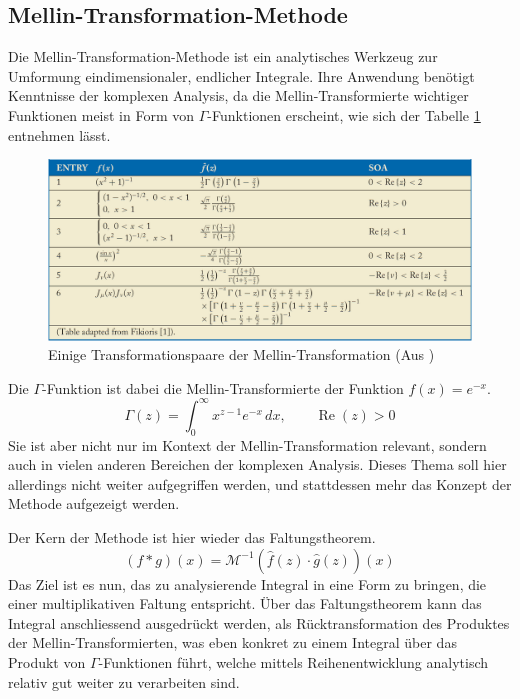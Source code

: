 \subsection{Mellin-Transformation-Methode
\label{mellin:subsection:mtmethod}}
Die Mellin-Transformation-Methode ist ein analytisches Werkzeug 
zur Umformung eindimensionaler, endlicher Integrale.
Ihre Anwendung benötigt Kenntnisse der komplexen Analysis, da 
die Mellin-Transformierte wichtiger Funktionen meist in Form von 
$\Gamma$-Funktionen erscheint, wie sich der Tabelle \ref{fig:mellin:tabelle} 
entnehmen lässt.
\begin{figure}
    \includegraphics[width=\textwidth]{papers/mellin/images/mellin_tabelle.png}
    \caption{Einige Transformationspaare der Mellin-Transformation 
    (Aus \cite{mellin:mellin-transform-method})}
    \label{fig:mellin:tabelle}
\end{figure}
Die $\Gamma$-Funktion ist dabei die Mellin-Transformierte der Funktion 
$f(x)=e^{-x}$.
\begin{equation}
    \Gamma(z) = 
    \int_{0}^{\infty} x^{z-1}e^{-x} \,dx,
    \qquad \operatorname{Re}(z) > 0
\end{equation}
Sie ist aber nicht nur im Kontext der Mellin-Transformation relevant, 
sondern auch in vielen anderen Bereichen der komplexen Analysis.
Dieses Thema soll hier allerdings nicht weiter aufgegriffen werden, 
und stattdessen mehr das Konzept der Methode aufgezeigt werden.

Der Kern der Methode ist hier wieder das Faltungstheorem.
\[
    (f \ast g)(x) 
    = \mathcal{M}^{-1}(\hat{f}(z) \cdot \hat{g}(z))(x)
\]
Das Ziel ist es nun, das zu analysierende Integral in 
eine Form zu bringen, die einer multiplikativen Faltung entspricht.
Über das Faltungstheorem kann das Integral anschliessend ausgedrückt 
werden, als Rücktransformation des Produktes der Mellin-Transformierten, 
was eben konkret zu einem Integral über das Produkt von  
$\Gamma$-Funktionen führt, welche mittels Reihenentwicklung analytisch 
relativ gut weiter zu verarbeiten sind.

